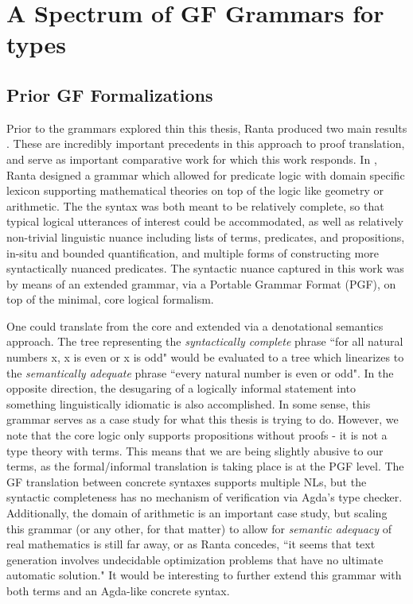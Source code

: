 
\section{A Spectrum of GF Grammars for types}

\subsection{Prior GF Formalizations}

Prior to the grammars explored thin this thesis, Ranta produced two main results
\cite{rantaLog} \cite{aarneHott}. These are incredibly important precedents in
this approach to proof translation, and serve as important comparative work for
which this work responds. In \cite{rantaLog}, Ranta designed a grammar which
allowed for predicate logic with domain specific lexicon supporting mathematical
theories on top of the logic like geometry or arithmetic. The the syntax was
both meant to be relatively complete, so that typical logical utterances of
interest could be accommodated, as well as relatively non-trivial linguistic
nuance including lists of terms, predicates, and propositions, in-situ and
bounded quantification, and multiple forms of constructing more syntactically
nuanced predicates. The syntactic nuance captured in this work was by means of an
extended grammar, via a Portable Grammar Format (PGF), on top of the minimal,
core logical formalism.

One could translate from the core and extended via a denotational semantics
approach. The tree representing the \emph{syntactically complete} phrase ``for
all natural numbers x, x is even or x is odd" would be evaluated to a tree which
linearizes to the \emph{semantically adequate} phrase ``every natural number is
even or odd". In the opposite direction, the desugaring of a logically informal
statement into something linguistically idiomatic is also accomplished. In some
sense, this grammar serves as a case study for what this thesis is trying to do.
However, we note that the core logic only supports propositions without proofs -
it is not a type theory with terms. This means that we are being slightly
abusive to our terms, as the formal/informal translation is taking place is at
the PGF level. The GF translation between concrete syntaxes supports multiple
NLs, but the syntactic completeness has no mechanism of verification via Agda's
type checker. Additionally, the domain of arithmetic is an important case study,
but scaling this grammar (or any other, for that matter) to allow for
\emph{semantic adequacy} of real mathematics is still far away, or as Ranta
concedes, ``it seems that text generation involves undecidable optimization
problems that have no ultimate automatic solution." It would be interesting to
further extend this grammar with both terms and an Agda-like concrete syntax. 

